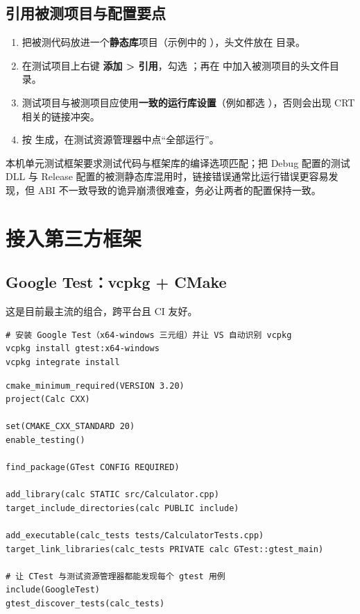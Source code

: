 \subsection{引用被测项目与配置要点}

\begin{enumerate}
  \item 把被测代码放进一个\textbf{静态库}项目（示例中的 ），头文件放在  目录。
  \item 在测试项目上右键 \textbf{添加 > 引用}，勾选 ；再在  中加入被测项目的头文件目录。
  \item 测试项目与被测项目应使用\textbf{一致的运行库设置}（例如都选 ），否则会出现 CRT 相关的链接冲突。
  \item 按  生成，在测试资源管理器中点“全部运行”。
\end{enumerate}

\begin{warnbox}[注意]
本机单元测试框架要求测试代码与框架库的编译选项匹配；把 Debug 配置的测试 DLL 与 Release 配置的被测静态库混用时，链接错误通常比运行错误更容易发现，但 ABI 不一致导致的诡异崩溃很难查，务必让两者的配置保持一致。
\end{warnbox}

\section{接入第三方框架}

\subsection{Google Test：vcpkg + CMake}

这是目前最主流的组合，跨平台且 CI 友好。

\begin{lstlisting}[style=shellstyle]
# 安装 Google Test（x64-windows 三元组）并让 VS 自动识别 vcpkg
vcpkg install gtest:x64-windows
vcpkg integrate install
\end{lstlisting}

\begin{lstlisting}[style=cmakestyle]
cmake_minimum_required(VERSION 3.20)
project(Calc CXX)

set(CMAKE_CXX_STANDARD 20)
enable_testing()

find_package(GTest CONFIG REQUIRED)

add_library(calc STATIC src/Calculator.cpp)
target_include_directories(calc PUBLIC include)

add_executable(calc_tests tests/CalculatorTests.cpp)
target_link_libraries(calc_tests PRIVATE calc GTest::gtest_main)

# 让 CTest 与测试资源管理器都能发现每个 gtest 用例
include(GoogleTest)
gtest_discover_tests(calc_tests)
\end{lstlisting}

